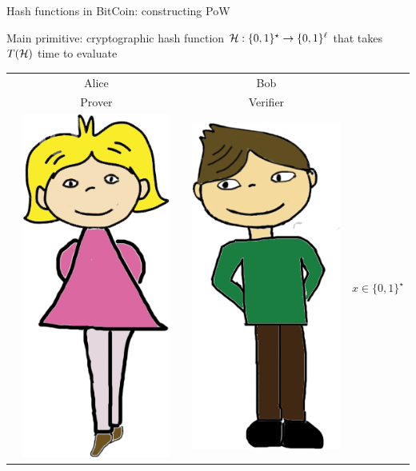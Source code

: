 \documentclass[usenames,dvipsnames, 9pt]{beamer}
\begin{document}
\begin{frame}{Hash functions in BitCoin: constructing PoW}

\Large
Main primitive: cryptographic hash function $\mathcal{H}:\{0,1\}^\star \rightarrow \{0,1\}^\ell$  that takes $T(\mathcal{H})$ time to evaluate

	\begin{center}
	\begin{tabular}{l c c c c}
		& Alice  & & Bob &  \\
		& Prover  & & Verifier &  \\
		& \multirow{5}{*}{\includegraphics[scale=0.15]{Alice}} & & 
		\multirow{5}{*}{\includegraphics[scale=0.15]{Bob}} & $x \in \{0,1\}^{\star}$   \\

\end{tabular}
\end{center}
\end{frame}
\end{document}
